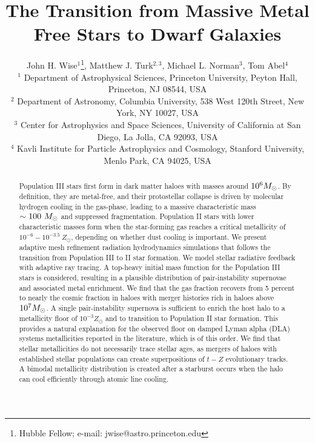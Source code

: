 \documentclass[useAMS,usenatbib]{mn2e}
\begin{document}
\title[Transition from Pop III to Dwarf Galaxies]{The Transition from
  Massive Metal Free Stars to Dwarf Galaxies}

\author[J. H. Wise et al.]{John H. Wise$^1$\thanks{Hubble Fellow;
    e-mail: jwise@astro.princeton.edu}, Matthew J. Turk$^{2,3}$, Michael
  L. Norman$^3$, Tom Abel$^4$\\
  $^{1}$ Department of Astrophysical Sciences, Princeton University,
  Peyton Hall, Princeton, NJ 08544, USA\\
  $^{2}$ Department of Astronomy, Columbia University, 538 West 120th
  Street, New York, NY 10027, USA\\
  $^{3}$ Center for Astrophysics and Space Sciences,
  University of California at San Diego, La Jolla, CA 92093, USA\\
  $^{4}$ Kavli Institute for Particle Astrophysics and Cosmology,
  Stanford University, Menlo Park, CA 94025, USA}

\pagerange{\pageref{firstpage}--\pageref{lastpage}} 

\maketitle
\label{firstpage}

\begin{abstract}

  Population III stars first form in dark matter haloes with masses
  around $10^6 \Ms$.  By definition, they are metal-free, and their
  protostellar collapse is driven by molecular hydrogen cooling in the
  gas-phase, leading to a massive characteristic mass $\sim 100~\Ms$
  and suppressed fragmentation.  Population II stars with lower
  characteristic masses form when the star-forming gas reaches a
  critical metallicity of $10^{-6} - 10^{-3.5}~Z_\odot$, depending on
  whether dust cooling is important.  We present adaptive mesh
  refinement radiation hydrodynamics simulations that follows the
  transition from Population III to II star formation.  We model
  stellar radiative feedback with adaptive ray tracing.  A top-heavy
  initial mass function for the Population III stars is considered,
  resulting in a plausible distribution of pair-instability supernovae
  and associated metal enrichment.  We find that the gas fraction
  recovers from 5 percent to nearly the cosmic fraction in haloes with
  merger histories rich in haloes above $10^7 \Ms$.  A single
  pair-instability supernova is sufficient to enrich the host halo to
  a metallicity floor of $10^{-3} Z_\odot$ and to transition to
  Population II star formation.  This provides a natural explanation
  for the observed floor on damped Lyman alpha (DLA) systems
  metallicities reported in the literature, which is of this order.
  We find that stellar metallicities do not necessarily trace stellar
  ages, as mergers of haloes with established stellar populations can
  create superpositions of $t-Z$ evolutionary tracks.  A bimodal
  metallicity distribution is created after a starburst occurs when
  the halo can cool efficiently through atomic line cooling.

\end{abstract}
\end{document}
